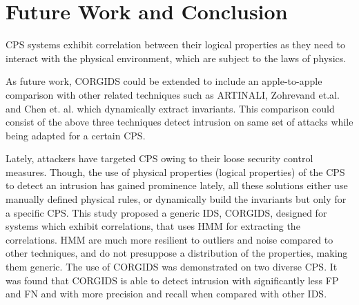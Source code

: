 
\chapter{\textbf{Future Work and Conclusion}}
\label{sec8:Conclusion}

\ac{CPS} systems exhibit correlation between their logical properties as they need to interact with the physical environment, which are subject to the laws of physics.

As future work, \ac{CORGIDS} could be extended to include an apple-to-apple comparison with other related techniques such as ARTINALI, Zohrevand et.al. and Chen et. al. which dynamically extract invariants. This comparison could consist of the above three techniques detect intrusion on same set of attacks while being adapted for a certain \ac{CPS}.

Lately, attackers have targeted \ac{CPS} owing to their loose security control measures. Though, the use of physical properties (logical properties) of the \ac{CPS} to detect an intrusion has gained prominence lately, all these solutions either use manually defined physical rules, or dynamically build the invariants but only for a specific \ac{CPS}. This study proposed a generic \ac{IDS}, \ac{CORGIDS}, designed for systems which exhibit correlations, that uses \acf{HMM} for extracting the correlations. \ac{HMM} are much more resilient to outliers and noise compared to other techniques, and do not presuppose a distribution of the properties, making them generic.
The use of \ac{CORGIDS} was demonstrated on two diverse \ac{CPS}. It was found that \ac{CORGIDS} is able to detect intrusion with significantly less \acf{FP} and \acf{FN} and with more precision and recall when compared with other \ac{IDS}. 
 \endinput
